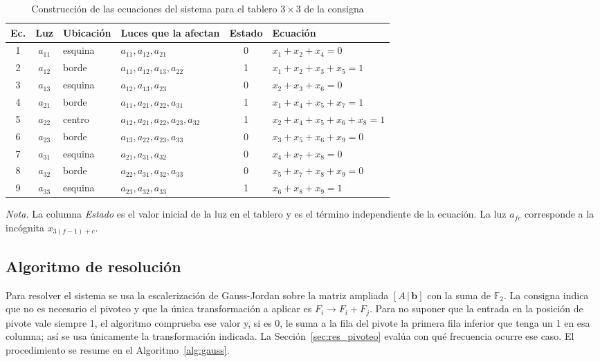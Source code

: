 \documentclass[12pt,a4paper]{article}
\theoremstyle{plain}
\theoremstyle{definition}
\theoremstyle{remark}
\newcommand{\F}{\mathbb{F}_2}
\begin{document}
\begin{table}[!htbp]
\centering
\caption{Construcción de las ecuaciones del sistema para el tablero $3\times 3$ de la consigna}
\label{tab:ecuaciones}
\small
\begin{tabular}{c c l l c l}
\toprule
Ec. & Luz & Ubicación & Luces que la afectan & Estado & Ecuación \\
\midrule
1 & $a_{11}$ & esquina & $a_{11},a_{12},a_{21}$ & 0 & $x_1+x_2+x_4=0$ \\
2 & $a_{12}$ & borde & $a_{11},a_{12},a_{13},a_{22}$ & 1 & $x_1+x_2+x_3+x_5=1$ \\
3 & $a_{13}$ & esquina & $a_{12},a_{13},a_{23}$ & 0 & $x_2+x_3+x_6=0$ \\
4 & $a_{21}$ & borde & $a_{11},a_{21},a_{22},a_{31}$ & 1 & $x_1+x_4+x_5+x_7=1$ \\
5 & $a_{22}$ & centro & $a_{12},a_{21},a_{22},a_{23},a_{32}$ & 1 & $x_2+x_4+x_5+x_6+x_8=1$ \\
6 & $a_{23}$ & borde & $a_{13},a_{22},a_{23},a_{33}$ & 0 & $x_3+x_5+x_6+x_9=0$ \\
7 & $a_{31}$ & esquina & $a_{21},a_{31},a_{32}$ & 0 & $x_4+x_7+x_8=0$ \\
8 & $a_{32}$ & borde & $a_{22},a_{31},a_{32},a_{33}$ & 0 & $x_5+x_7+x_8+x_9=0$ \\
9 & $a_{33}$ & esquina & $a_{23},a_{32},a_{33}$ & 1 & $x_6+x_8+x_9=1$ \\
\bottomrule
\end{tabular}

\vspace{4pt}
\begin{minipage}{0.95\textwidth}
\footnotesize\textit{Nota.} La columna \textit{Estado} es el valor inicial de la luz en el tablero y es el término independiente de la ecuación. La luz $a_{fc}$ corresponde a la incógnita $x_{3(f-1)+c}$.
\end{minipage}
\end{table}

\subsection{Algoritmo de resolución}\label{sec:algoritmo}

Para resolver el sistema se usa la escalerización de Gauss-Jordan sobre la matriz ampliada $[A\,|\,\mathbf{b}]$ con la suma de $\F$. La consigna indica que no es necesario el pivoteo y que la única transformación a aplicar es $F_i\to F_i+F_j$. Para no suponer que la entrada en la posición de pivote vale siempre 1, el algoritmo comprueba ese valor y, si es 0, le suma a la fila del pivote la primera fila inferior que tenga un 1 en esa columna; así se usa únicamente la transformación indicada. La Sección~\ref{sec:res_pivoteo} evalúa con qué frecuencia ocurre ese caso. El procedimiento se resume en el Algoritmo~\ref{alg:gauss}.
\end{document}
